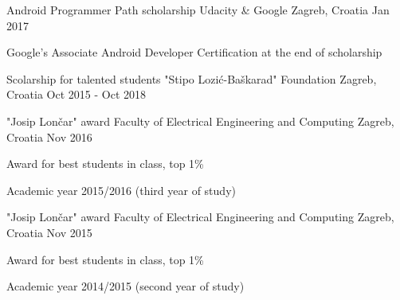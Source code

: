 
\begin{cventries}

  \cventry
    {Android Programmer Path scholarship} %
    {Udacity \& Google} %
    {Zagreb, Croatia} %
    {Jan 2017} %
    {
      \begin{cvitems} %
        \item {Google’s Associate Android Developer Certification at the end of scholarship}
      \end{cvitems}
    }

  \cventry
    {Scolarship for talented students} %
    {"Stipo Lozić-Baškarad" Foundation} %
    {Zagreb, Croatia} %
    {Oct 2015 - Oct 2018} %
    {}

  \cventry
    {"Josip Lončar"​ award} %
    {Faculty of Electrical Engineering and Computing} %
    {Zagreb, Croatia} %
    {Nov 2016} %
    {
      \begin{cvitems} %
        \item {Award for best students in class, top 1\%}
        \item {Academic year 2015/2016 (third year of study)}
      \end{cvitems}
    }

  \cventry
    {"Josip Lončar"​ award} %
    {Faculty of Electrical Engineering and Computing} %
    {Zagreb, Croatia} %
    {Nov 2015} %
    {
      \begin{cvitems} %
        \item {Award for best students in class, top 1\%}
        \item {Academic year 2014/2015 (second year of study)}
      \end{cvitems}
    }


\end{cventries}
